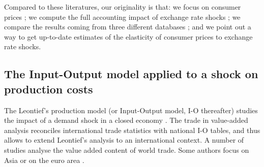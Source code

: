 \documentclass[11pt,a4paper]{article}
\begin{document}
Compared to these literatures, our originality is that: we focus on consumer prices ; we compute the full accounting impact of exchange rate shocks ; we compare the results coming from three different databases ; and we point out a way to get up-to-date estimates of the elasticity of consumer prices to exchange rate shocks.



\subsection{The Input-Output model applied to a shock on production costs} 
\label{subsec:io}
The Leontief's production model (or Input-Output model, I-O thereafter) studies the impact of a demand shock in a closed economy \citep{Leontief1951}. 
The trade in value-added analysis reconciles international trade statistics with national I-O tables, and thus allows to extend Leontief's analysis to an international context.
A number of studies \citep{Hummels2001,Daudin2006,Daudin2011, DeBacker2012,Johnson2012,Koopman2014, Amador2015,Los2016} analyse the value added content of world trade. Some authors focus on Asia \citep{Sato2014} or on the euro area \citep{Cappariello2015}.
\end{document}
